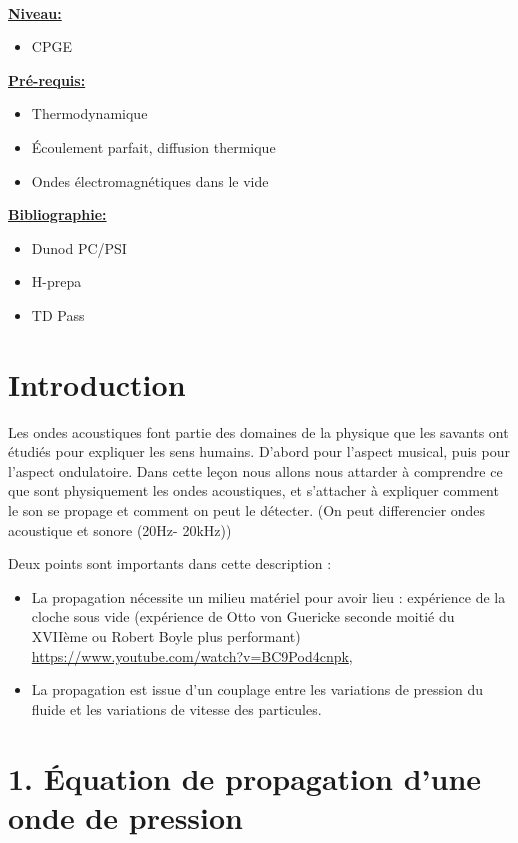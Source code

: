 \documentclass[french, a4paper, 10pt, twocolumn, landscape]{article}
\begin{document}
\hrulefill\\

\noindent\underline{\textbf{Niveau:}}
\begin{itemize}
  \item CPGE 
\end{itemize}
\underline{\textbf{Pr{\'e}-requis: }}

\begin{itemize}  
\item Thermodynamique
\item Écoulement parfait, diffusion thermique
\item Ondes électromagnétiques dans le vide
\end{itemize}
\underline{\textbf{Bibliographie:}}

\begin{itemize}
  \item Dunod PC/PSI
  \item H-prepa
  \item TD Pass
\end{itemize}
\hrulefill


\section*{Introduction}

Les ondes acoustiques font partie des domaines de la physique que les savants ont étudiés pour expliquer les sens humains. D'abord pour l'aspect musical, puis pour l'aspect ondulatoire. Dans cette leçon nous allons nous attarder à comprendre ce que sont physiquement les ondes acoustiques, et s'attacher à expliquer comment le son se propage et comment on peut le détecter. (On peut differencier ondes acoustique et sonore (20Hz- 20kHz))

Deux points sont importants dans cette description :
  \begin{itemize}
      \item La propagation nécessite un milieu matériel pour avoir lieu : expérience de la cloche sous vide (expérience de Otto von Guericke seconde moitié du XVIIème ou Robert Boyle plus performant) \url{https://www.youtube.com/watch?v=BC9Pod4cnpk},
      \item La propagation est issue d'un couplage entre les variations de pression du fluide et les variations de vitesse des particules.
  \end{itemize}

\section*{1. Équation de propagation d'une onde de pression}
\end{document}
